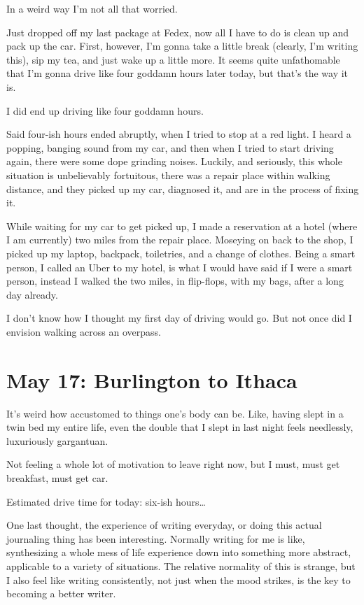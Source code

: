 \documentclass[../butidigress.tex]{subfiles}
\begin{document}
In a weird way I'm not all that worried.

\entryskip

Just dropped off my last package at Fedex, now all I have to do is clean up and pack up the car.
First, however, I'm gonna take a little break (clearly, I'm writing this), sip my tea, and just wake up a little more.
It seems quite unfathomable that I'm gonna drive like four goddamn hours later today, but that's the way it is.

\entryskip

I did end up driving like four goddamn hours.

Said four-ish hours ended abruptly, when I tried to stop at a red light.
I heard a popping, banging sound from my car, and then when I tried to start driving again, there were some dope grinding noises.
Luckily, and seriously, this whole situation is unbelievably fortuitous, there was a repair place within walking distance, and they picked up my car, diagnosed it, and are in the process of fixing it.

While waiting for my car to get picked up, I made a reservation at a hotel (where I am currently) two miles from the repair place.
Moseying on back to the shop, I picked up my laptop, backpack, toiletries, and a change of clothes.
Being a smart person, I called an Uber to my hotel, is what I would have said if I were a smart person, instead I walked the two miles, in flip-flops, with my bags, after a long day already.

I don't know how I thought my first day of driving would go.
But not once did I envision walking across an overpass.

\section{May 17: Burlington to Ithaca}
It's weird how accustomed to things one's body can be.
Like, having slept in a twin bed my entire life, even the double that I slept in last night feels needlessly, luxuriously gargantuan.

Not feeling a whole lot of motivation to leave right now, but I must, must get breakfast, must get car.

Estimated drive time for today: six-ish hours\ldots

One last thought, the experience of writing everyday, or doing this actual journaling thing has been interesting.
Normally writing for me is like, synthesizing a whole mess of life experience down into something more abstract, applicable to a variety of situations.
The relative normality of this is strange, but I also feel like writing consistently, not just when the mood strikes, is the key to becoming a better writer.
\end{document}
